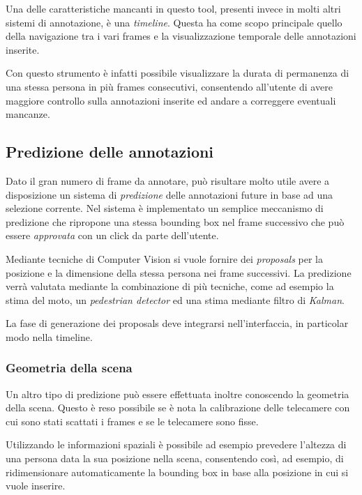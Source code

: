 Una delle caratteristiche mancanti in questo tool, presenti invece in molti altri sistemi di annotazione, è una \emph{timeline}. Questa ha come scopo principale quello della navigazione tra i vari frames e la visualizzazione temporale delle annotazioni inserite. 

Con questo strumento è infatti possibile visualizzare la durata di permanenza di una stessa persona in più frames consecutivi, consentendo all'utente di avere maggiore controllo sulla annotazioni inserite ed andare a correggere eventuali mancanze. 

\subsection{Predizione delle annotazioni}

Dato il gran numero di frame da annotare, può risultare molto utile avere a disposizione un sistema di \emph{predizione} delle annotazioni future in base ad una selezione corrente. 
Nel sistema è implementato un semplice meccanismo di predizione che ripropone una stessa bounding box nel frame successivo che può essere \emph{approvata} con un click da parte dell'utente.

Mediante tecniche di Computer Vision si vuole fornire dei \emph{proposals} per la posizione e la dimensione della stessa persona nei frame successivi. La predizione verrà valutata mediante la combinazione di più tecniche, come ad esempio la stima del moto, un \emph{pedestrian detector} ed una stima mediante filtro di \emph{Kalman}.

La fase di generazione dei proposals deve integrarsi nell'interfaccia, in particolar modo nella timeline.

\subsubsection{Geometria della scena}

Un altro tipo di predizione può essere effettuata inoltre conoscendo la geometria della scena. Questo è reso possibile se è nota la calibrazione delle telecamere con cui sono stati scattati i frames e se le telecamere sono fisse.

Utilizzando le informazioni spaziali è possibile ad esempio prevedere l'altezza di una persona data la sua posizione nella scena, consentendo così, ad esempio, di ridimensionare automaticamente la bounding box in base alla posizione in cui si vuole inserire.


